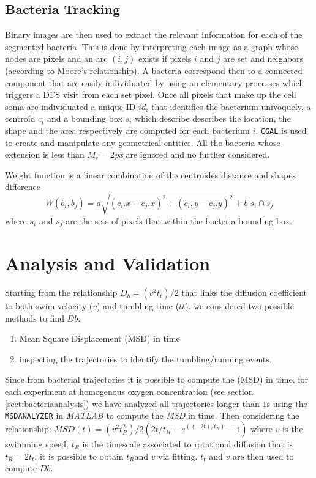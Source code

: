 \documentclass[conference]{IEEEtran}
\begin{document}
\subsection{Bacteria Tracking}
\label{ciao}
Binary images are then used to extract the relevant information for each of the segmented bacteria. This is done by interpreting each image as a graph whose nodes are pixels and an arc $(i,j)$ exists if pixels $i$ and $j$ are set and neighbors (according to Moore's relationship). A bacteria correspond then to a connected component that are easily individuated by using an elementary processes which triggers a DFS visit from each set pixel. Once all pixels that make up the cell soma are individuated a unique ID $id_i$ that  identifies the bacterium univoquely, a centroid $c_i$ and a bounding box $s_i$ which describe describes the location, the shape and the area respectively are computed for each bacterium $i$. \texttt{CGAL} \cite{CGAL} is used to create and manipulate any geometrical entities. All the bacteria whose extension is less than $M_e = 2$\textit{px} are ignored and no further considered.

Weight function is a linear combination of the centroides distance and shapes difference 
\begin{equation}
\label{sec:bacttracking}
W(b_i,b_j) = a \sqrt{(c_i.x - c_j.x)^2 + (c_i,y-c_j.y)^2} + b |s_i \cap s_j
\end{equation}
where $s_i$ and $s_j$ are the sets of pixels that within the bacteria bounding box.






\section{Analysis and Validation}
Starting from the relationship $D_b=  (v^2 t_t)/2$  \cite{Berg:1993} that links the diffusion coefficient to both swim velocity ($v$) and tumbling time ($tt$), 
we considered two possible methods to find $Db$:
\begin{enumerate}
	\item Mean Square Displacement (MSD) in time
	\item inspecting the trajectories to identify the tumbling/running events.
\end{enumerate}
	
	Since from bacterial trajectories it is possible to compute the (MSD) in time, for each experiment at homogenous oxygen concentration (see section \ref{sect:bacteriaanalysis}) we have analyzed all trajectories longer than $1$s  using the \texttt{MSDANALYZER} \cite{msdanalyzer}\cite{msdanalyzer:web} in \textit{MATLAB}  to compute the \textit{MSD} in time. Then considering the relationship:
$MSD(t)=(  v^2 t_R^2)/2 (2t/t_R +e^((-2t)/t_R )-1)$ \cite{Howse:2007}
where $v$ is the swimming speed, $t_R$ is the timescale associated to rotational diffusion that is $t_R=2t_t$, it is possible to obtain $t_R $and $v$ via fitting. $t_t$ and $v$ are then used to compute $Db$.
\end{document}
